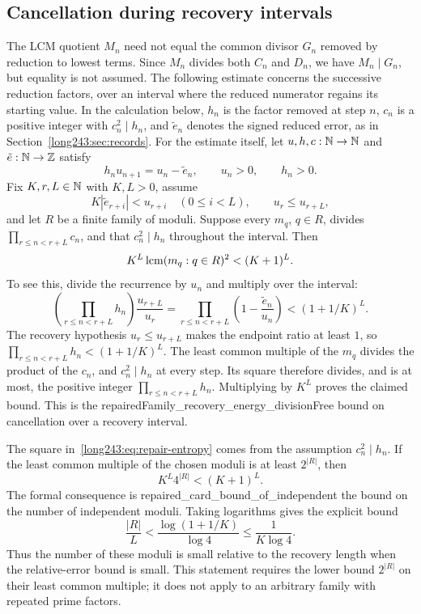 \documentclass[11pt]{article}
\begin{document}
\subsection{Cancellation during recovery intervals}

The LCM quotient $M_n$ need not equal the common divisor $G_n$ removed
by reduction to lowest terms. Since $M_n$ divides both $C_n$ and $D_n$,
we have $M_n\mid G_n$, but equality is not assumed. The following
estimate concerns the successive reduction factors, over an interval
where the reduced numerator regains its starting value.
In the calculation below, $h_n$ is the factor removed at step $n$,
$c_n$ is a positive integer with $c_n^2\mid h_n$, and $\tilde e_n$
denotes the signed reduced error, as in Section~\ref{long243:sec:records}.
For the estimate itself, let $u,h,c:\mathbb{N}\to\mathbb{N}$ and $\tilde e:\mathbb{N}\to\mathbb{Z}$ satisfy
\[
 h_nu_{n+1}=u_n-\tilde e_n,
 \qquad u_n>0,
 \qquad h_n>0.
\]
Fix $K,r,L\in\mathbb{N}$ with $K,L>0$, assume
\[
 K|\tilde e_{r+i}|<u_{r+i}\quad(0\le i<L),
 \qquad u_r\le u_{r+L},
\]
and let $R$ be a finite family of moduli.  Suppose every $m_q$, $q\in R$,
divides $\prod_{r\le n<r+L}c_n$, and that
$c_n^2\mid h_n$ throughout the interval.  Then
\begin{equation}\label{long243:eq:repair-entropy}
 K^L\lcm(m_q:q\in R)^2<(K+1)^L.
\end{equation}
To see this, divide the recurrence by $u_n$ and multiply over the interval:
\[
 \left(\prod_{r\le n<r+L}h_n\right)\frac{u_{r+L}}{u_r}
 =\prod_{r\le n<r+L}\left(1-\frac{\tilde e_n}{u_n}\right)
 <(1+1/K)^L.
\]
The recovery hypothesis $u_r\le u_{r+L}$ makes the endpoint ratio at
least $1$, so $\prod_{r\le n<r+L}h_n<(1+1/K)^L$.
The least common multiple of the $m_q$ divides the product of the
$c_n$, and $c_n^2\mid h_n$ at every step. Its square therefore divides,
and is at most, the positive integer $\prod_{r\le n<r+L}h_n$.
Multiplying by $K^L$ proves the claimed bound.
This is the
      {repairedFamily_recovery_energy_divisionFree}
      {bound on cancellation over a recovery interval}.

The square in~\eqref{long243:eq:repair-entropy} comes from the assumption
$c_n^2\mid h_n$. If the least common multiple of the chosen moduli
is at least $2^{|R|}$, then
\[
 K^L4^{|R|}<(K+1)^L.
\]
The formal consequence is
      {repaired_card_bound_of_independent}
      {the bound on the number of independent moduli}.
Taking logarithms gives the explicit bound
\[
 \frac{|R|}{L}<\frac{\log(1+1/K)}{\log4}
 \le\frac1{K\log4}.
\]
Thus the number of these moduli is small relative to the recovery length
when the relative-error bound is small. This statement requires the lower bound
$2^{|R|}$ on their least common multiple; it does not apply to an arbitrary
family with repeated prime factors.
\end{document}
